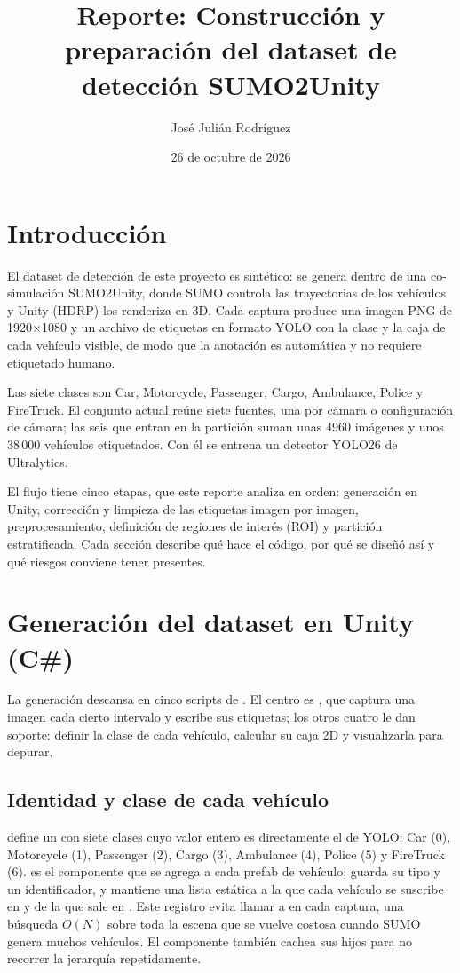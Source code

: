 \documentclass[11pt,a4paper]{article}
\title{Reporte: Construcción y preparación del dataset de detección SUMO2Unity}
\author{José Julián Rodríguez}
\date{26 de octubre de 2026}
\begin{document}
\maketitle

\section{Introducción}

El dataset de detección de este proyecto es sintético: se genera dentro de una co-simulación SUMO2Unity, donde SUMO controla las trayectorias de los vehículos y Unity (HDRP) los renderiza en 3D. Cada captura produce una imagen PNG de 1920$\times$1080 y un archivo de etiquetas en formato YOLO con la clase y la caja de cada vehículo visible, de modo que la anotación es automática y no requiere etiquetado humano.

Las siete clases son Car, Motorcycle, Passenger, Cargo, Ambulance, Police y FireTruck. El conjunto actual reúne siete fuentes, una por cámara o configuración de cámara; las seis que entran en la partición suman unas 4960 imágenes y unos 38\,000 vehículos etiquetados. Con él se entrena un detector YOLO26 de Ultralytics.

El flujo tiene cinco etapas, que este reporte analiza en orden: generación en Unity, corrección y limpieza de las etiquetas imagen por imagen, preprocesamiento, definición de regiones de interés (ROI) y partición estratificada. Cada sección describe qué hace el código, por qué se diseñó así y qué riesgos conviene tener presentes.

\section{Generación del dataset en Unity (C\#)}

La generación descansa en cinco scripts de . El centro es , que captura una imagen cada cierto intervalo y escribe sus etiquetas; los otros cuatro le dan soporte: definir la clase de cada vehículo, calcular su caja 2D y visualizarla para depurar.

\subsection{Identidad y clase de cada vehículo}

 define un  con siete clases cuyo valor entero es directamente el  de YOLO: Car (0), Motorcycle (1), Passenger (2), Cargo (3), Ambulance (4), Police (5) y FireTruck (6).  es el componente que se agrega a cada prefab de vehículo; guarda su tipo y un identificador, y mantiene una lista estática  a la que cada vehículo se suscribe en  y de la que sale en . Este registro evita llamar a  en cada captura, una búsqueda $O(N)$ sobre toda la escena que se vuelve costosa cuando SUMO genera muchos vehículos. El componente también cachea sus  hijos para no recorrer la jerarquía repetidamente.
\end{document}
